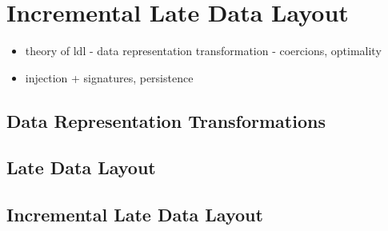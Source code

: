 \section{Incremental Late Data Layout}
\label{sec:ildl}
\begin{itemize}
  \item theory of ldl - data representation transformation - coercions, optimality
  \item injection + signatures, persistence
\end{itemize}

\subsection{Data Representation Transformations}






\subsection {Late Data Layout}








\subsection{Incremental Late Data Layout}

